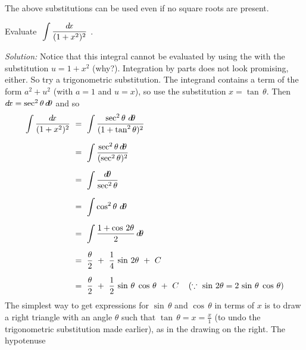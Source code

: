 The above substitutions can be used even if no square roots are present.
\newpage
\begin{exmp}\label{exmp:trigsub2}
\noindent Evaluate $~\displaystyle\int \frac{d\!x}{(1 + x^2)^2}~$.\vspace{1mm}
\par\noindent\emph{Solution:} Notice that this integral cannot be evaluated by
using the  with the substitution $u=1+x^2$ (why?). Integration by
parts does not look promising, either. So try a trigonometric substitution. The
integrand contains a term of the form $a^2 + u^2$ (with $a=1$ and $u=x$), so use
the substitution $x=\tan\,\theta$. Then $d\!x = \sec^2 \theta\,d\!\theta$ and so
\begin{align*}
\int \frac{d\!x}{(1 + x^2)^2} ~&=~ \int \frac{\sec^2 \theta~d\!\theta}{(1 + \tan^2 \theta)^2}\\[6pt]
&=~ \int \frac{\sec^2 \theta\,d\!\theta}{(\sec^2 \theta)^2}\\[6pt]
&=~ \int \frac{d\!\theta}{\sec^2 \theta}\\[6pt]
&=~ \int \cos^2 \theta~d\!\theta\\[6pt]
&=~ \int \frac{1 + \cos\,2\theta}{2}\,d\!\theta\\[6pt]
&=~ \frac{\theta}{2} ~+~ \frac{1}{4}\,\sin\,2\theta ~+~ C\\[6pt]
&=~ \frac{\theta}{2} ~+~ \frac{1}{2}\,\sin\,\theta\;\cos\,\theta ~+~ C\quad\left(\because~\sin\,2\theta = 2\,\sin\,\theta\;\cos\,\theta\right)
\end{align*}
The simplest way to get expressions for $\sin\,\theta$ and $\cos\,\theta$ in
terms of $x$ is to draw a right triangle with an angle $\theta$ such that
$\tan\,\theta = x = \frac{x}{1}$ (to undo the trigonometric substitution made earlier), as in the drawing on the right. The hypotenuse

\end{exmp}
